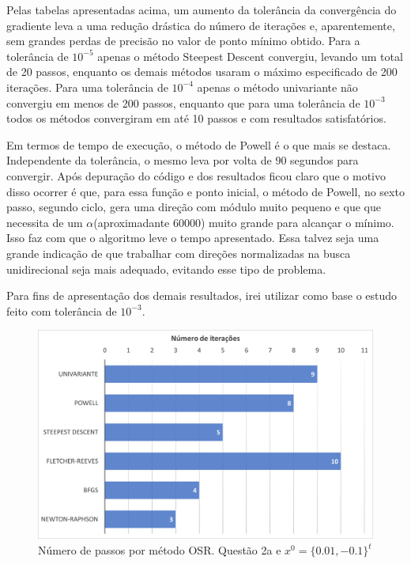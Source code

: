 \documentclass[10pt, a4paper]{article}
\begin{document}
Pelas tabelas apresentadas acima, um aumento da tolerância da convergência do gradiente leva a uma redução drástica
do número de iterações e, aparentemente, sem grandes perdas de precisão no valor de ponto mínimo obtido. Para a 
tolerância de $10^{-5}$ apenas o método Steepest Descent convergiu, levando um total de 20 passos, enquanto os 
demais métodos usaram o máximo especificado de 200 iterações. Para uma tolerância de $10^{-4}$ apenas o método univariante
não convergiu em menos de 200 passos, enquanto que para uma tolerância de $10^{-3}$ todos os métodos convergiram em até 10
passos e com resultados satisfatórios.

Em termos de tempo de execução, o método de Powell é o que mais se destaca. Independente da tolerância, o mesmo leva por volta
de 90 segundos para convergir. Após depuração do código e dos resultados ficou claro que o motivo disso ocorrer é que, 
para essa função e ponto inicial, o método de Powell, no sexto passo, segundo ciclo, gera uma direção com módulo muito pequeno e que
que necessita de um $\alpha$(aproximadante 60000) muito grande para alcançar o mínimo. Isso faz com que o algoritmo leve o tempo apresentado.
Essa talvez seja uma grande indicação de que trabalhar com direções normalizadas na busca unidirecional
seja mais adequado, evitando esse tipo de problema.

Para fins de apresentação dos demais resultados, irei utilizar como base o estudo feito com tolerância de $10^{-3}$.

\begin{figure}[H]
  \centering
  \includegraphics[scale=0.4]{figuras/q2a_passos_P1.PNG}
  \caption{Número de passos por método OSR. Questão 2a e $x^0 = \{0.01,-0.1\}^t$}
\end{figure}
\end{document}

